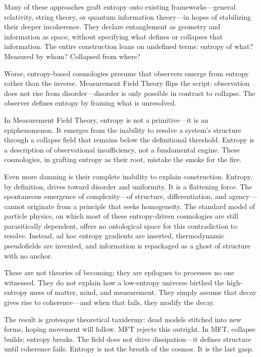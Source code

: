 Many of these approaches graft entropy onto existing frameworks—general relativity, string theory, or quantum information theory—in hopes of stabilizing their deeper incoherence. They declare entanglement as geometry and information as space, without specifying what defines or collapses that information. The entire construction leans on undefined terms: entropy of what? Measured by whom? Collapsed from where?

Worse, entropy-based cosmologies presume that observers emerge from entropy rather than the inverse. Measurement Field Theory flips the script: observation does not rise from disorder—disorder is only possible in contrast to collapse. The observer defines entropy by framing what is unresolved.

In Measurement Field Theory, entropy is not a primitive—it is an epiphenomenon. It emerges from the inability to resolve a system’s structure through a collapse field that remains below the definitional threshold. Entropy is a description of observational insufficiency, not a fundamental engine. These cosmologies, in grafting entropy as their root, mistake the smoke for the fire.

Even more damning is their complete inability to explain construction. Entropy, by definition, drives toward disorder and uniformity. It is a flattening force. The spontaneous emergence of complexity—of structure, differentiation, and agency—cannot originate from a principle that seeks homogeneity. The standard model of particle physics, on which most of these entropy-driven cosmologies are still parasitically dependent, offers no ontological space for this contradiction to resolve. Instead, ad hoc entropy gradients are inserted, thermodynamic pseudofields are invented, and information is repackaged as a ghost of structure with no anchor. 

These are not theories of becoming; they are epilogues to processes no one witnessed. They do not explain how a low-entropy universe birthed the high-entropy mess of matter, mind, and measurement. They simply assume that decay gives rise to coherence—and when that fails, they modify the decay.

The result is grotesque theoretical taxidermy: dead models stitched into new forms, hoping movement will follow. MFT rejects this outright. In MFT, collapse builds; entropy breaks. The field does not drive dissipation—it defines structure until coherence fails. Entropy is not the breath of the cosmos. It is the last gasp.


